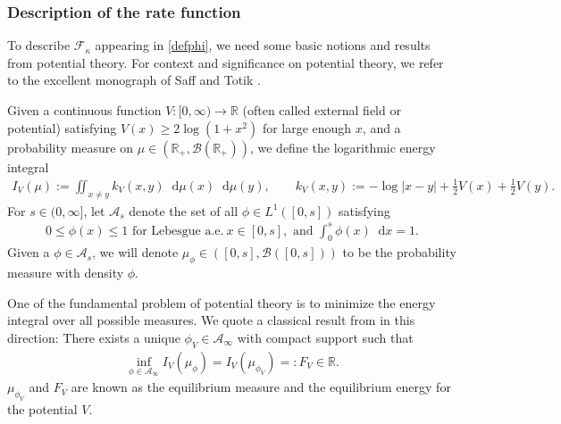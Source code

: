 \documentclass[reqno,11pt]{amsart}
\numberwithin{equation}{section}
\theoremstyle{definition}
\newcommand{\R}{\mathbb{R}}
\newcommand*\diff{\mathop{}\!\mathrm{d}}
\begin{document}
\subsubsection{Description of the rate function} \label{sec.rate}

To describe $\mathcal{F}_\kappa$ appearing in \eqref{defphi}, we need some basic notions and results from potential theory. For context and significance on potential theory, we refer to the excellent monograph of Saff and Totik \cite{saff1997logarithmic}.

Given a continuous function $V: [0,\infty)\to \mathbb{R}$ (often called external field or potential) satisfying $V(x) \ge 2\log(1+x^2)$ for large enough $x$, and  a probability measure on $\mu\in (\mathbb{R}_+,\mathcal{B}(\mathbb{R}_+))$, we define the logarithmic energy integral
\begin{align}\label{e.IVmu}
    I_V(\mu):=\iint_{x\neq y} k_V(x,y)\diff \mu(x) \diff \mu(y), \qquad k_V(x,y):=-\log|x-y|+\frac12V(x)+\frac12V(y).
\end{align}
For $s\in (0,\infty]$, let $\mathcal{A}_s$ denote the set of all $\phi\in L^1([0,s])$ satisfying
\begin{align}\label{cala}
0 \le \phi(x) \le 1 \mbox{ for Lebesgue a.e.}~x\in [0,s], \mbox{ and }\int_0^s \phi(x)\diff x=1.
\end{align}
Given a $\phi\in \mathcal{A}_{s}$, we will denote $\mu_{\phi} \in ([0,s],\mathcal{B}([0,s]))$ to be the probability measure with density $\phi$. 

One of the fundamental problem of potential theory is to minimize the energy integral over all possible measures. We quote a classical result from \cite{ds97} in this direction: There exists a unique $\phi_V \in \mathcal{A}_\infty$ with compact support such that
\begin{align}\label{l.ds97}
    \inf_{\phi \in \mathcal{A}_\infty} I_V(\mu_\phi)=I_V(\mu_{\phi_V})=:F_V \in \R. 
\end{align}
$\mu_{\phi_V}$ and $F_V$ are known as the equilibrium measure and the equilibrium energy for the potential $V$. 

\medskip
\end{document}
